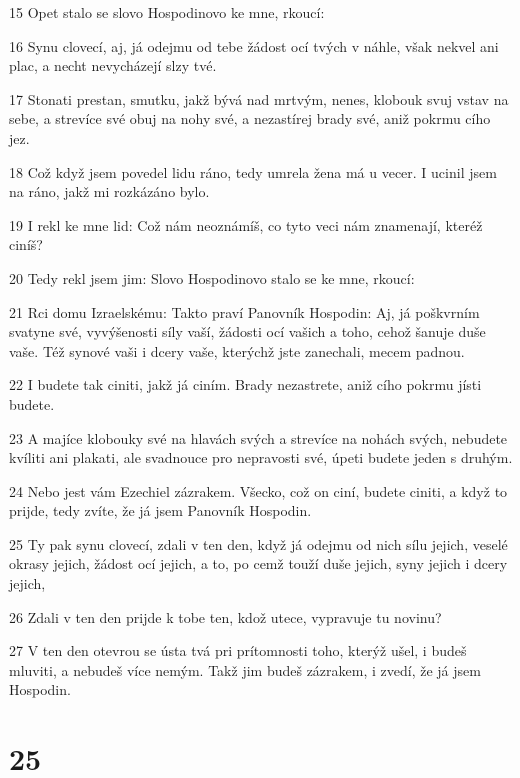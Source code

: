 \par 15 Opet stalo se slovo Hospodinovo ke mne, rkoucí:
\par 16 Synu clovecí, aj, já odejmu od tebe žádost ocí tvých v náhle, však nekvel ani plac, a necht nevycházejí slzy tvé.
\par 17 Stonati prestan, smutku, jakž bývá nad mrtvým, nenes, klobouk svuj vstav na sebe, a strevíce své obuj na nohy své, a nezastírej brady své, aniž pokrmu cího jez.
\par 18 Což když jsem povedel lidu ráno, tedy umrela žena má u vecer. I ucinil jsem na ráno, jakž mi rozkázáno bylo.
\par 19 I rekl ke mne lid: Což nám neoznámíš, co tyto veci nám znamenají, kteréž ciníš?
\par 20 Tedy rekl jsem jim: Slovo Hospodinovo stalo se ke mne, rkoucí:
\par 21 Rci domu Izraelskému: Takto praví Panovník Hospodin: Aj, já poškvrním svatyne své, vyvýšenosti síly vaší, žádosti ocí vašich a toho, cehož šanuje duše vaše. Též synové vaši i dcery vaše, kterýchž jste zanechali, mecem padnou.
\par 22 I budete tak ciniti, jakž já ciním. Brady nezastrete, aniž cího pokrmu jísti budete.
\par 23 A majíce klobouky své na hlavách svých a strevíce na nohách svých, nebudete kvíliti ani plakati, ale svadnouce pro nepravosti své, úpeti budete jeden s druhým.
\par 24 Nebo jest vám Ezechiel zázrakem. Všecko, což on ciní, budete ciniti, a když to prijde, tedy zvíte, že já jsem Panovník Hospodin.
\par 25 Ty pak synu clovecí, zdali v ten den, když já odejmu od nich sílu jejich, veselé okrasy jejich, žádost ocí jejich, a to, po cemž touží duše jejich, syny jejich i dcery jejich,
\par 26 Zdali v ten den prijde k tobe ten, kdož utece, vypravuje tu novinu?
\par 27 V ten den otevrou se ústa tvá pri prítomnosti toho, kterýž ušel, i budeš mluviti, a nebudeš více nemým. Takž jim budeš zázrakem, i zvedí, že já jsem Hospodin.

\chapter{25}

